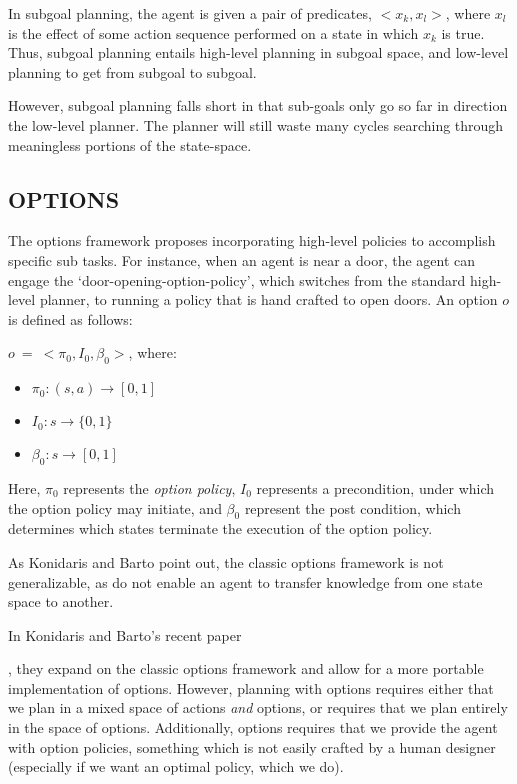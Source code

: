 In subgoal planning, the agent is given a pair of predicates, $<x_k, x_l >$, where $x_l$ is the effect of some action sequence performed on a state in which $x_k$ is true. Thus, subgoal planning entails high-level planning in subgoal space, and low-level planning to get from subgoal to subgoal.

However, subgoal planning falls short in that sub-goals only go so far in direction the low-level planner. The planner will still waste many cycles searching through meaningless portions of the state-space.


\subsection{OPTIONS}

The options framework proposes incorporating high-level policies to accomplish specific sub tasks. For instance, when an agent is near a door, the agent can engage the `door-opening-option-policy', which switches from the standard high-level planner, to running a policy that is hand crafted to open doors. An option $o$ is defined as follows:

$o\ =\ <\pi_0, I_0, \beta_0>$, where:

\begin{itemize}
\item[] $\pi_0 : (s,a) \rightarrow [0,1]$
\item[] $I_0 : s \rightarrow \{0,1\}$
\item[] $\beta_0 : s \rightarrow [0,1]$
\end{itemize}

Here, $\pi_0$ represents the {\it option policy}, $I_0$ represents a precondition, under which the option policy may initiate, and $\beta_0$ represent the post condition, which determines which states terminate the execution of the option policy.

As Konidaris and Barto point out, the classic options framework is not generalizable, as do not enable an agent to transfer knowledge from one state space to another.  In Konidaris and Barto's recent paper, they expand on the classic options framework and allow for a more portable implementation of options. However, planning with options requires either that we plan in a mixed space of actions {\it and} options, or requires that we plan entirely in the space of options. Additionally, options requires that we provide the agent with option policies, something which is not easily crafted by a human designer (especially if we want an optimal policy, which we do).

